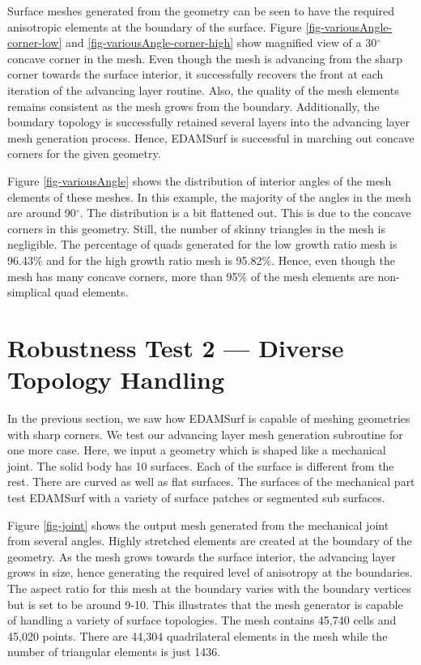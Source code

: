 Surface meshes generated from the geometry can be seen to have the required anisotropic elements at the boundary of the surface. Figure \ref{fig-variousAngle-corner-low} and \ref{fig-variousAngle-corner-high} show magnified view of a 30$^\circ$ concave corner in the mesh. Even though the mesh is advancing from the sharp corner towards the surface interior, it successfully recovers the front at each iteration of the advancing layer routine. Also, the quality of the mesh elements remains consistent as the mesh grows from the boundary. Additionally, the boundary topology is successfully retained several layers into the advancing layer mesh generation process. Hence, EDAMSurf is successful in marching out concave corners for the given geometry.

Figure \ref{fig-variousAngle} shows the distribution of interior angles of the mesh elements of these meshes. In this example, the majority of the angles in the mesh are around 90$^\circ$. The distribution is a bit flattened out. This is due to the concave corners in this geometry. Still, the number of skinny triangles in the mesh is negligible. The percentage of quads generated for the low growth ratio mesh is 96.43\% and for the high growth ratio mesh is 95.82\%. Hence, even though the mesh has many concave corners, more than 95\% of the mesh elements are non-simplical quad elements.

\section{Robustness Test 2 --- Diverse Topology Handling}

In the previous section, we saw how EDAMSurf is capable of meshing geometries with sharp corners. We test our advancing layer mesh generation subroutine for one more case. Here, we input a geometry which is shaped like a mechanical joint. The solid body has 10 surfaces. Each of the surface is different from the rest. There are curved as well as flat surfaces. The surfaces of the mechanical part test EDAMSurf with a variety of surface patches or segmented sub surfaces.

Figure \ref{fig-joint} shows the output mesh generated from the mechanical joint from several angles. Highly stretched elements are created at the boundary of the geometry. As the mesh grows towards the surface interior, the advancing layer grows in size, hence generating the required level of anisotropy at the boundaries. The aspect ratio for this mesh at the boundary varies with the boundary vertices but is set to be around 9-10. This illustrates that the mesh generator is capable of handling a variety of surface topologies. The mesh contains 45,740 cells and 45,020 points. There are 44,304 quadrilateral elements in the mesh while the number of triangular elements is just 1436.


